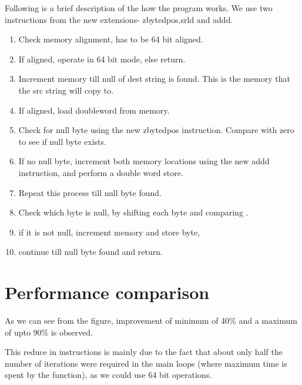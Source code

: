 \documentclass[12pt]{article}
\begin{document}
Following is a brief description of the how the program works. We use two instructions from the new extensions- zbytedpos,srld and addd. 


\begin{enumerate}
    \item Check memory alignment, has to be 64 bit aligned.
    \item If aligned, operate in 64 bit mode, else return.
    \item Increment memory till null of dest string is found. This is the memory that the src string will copy to.
    \item If aligned, load doubleword from memory.
    \item Check for null byte using the new zbytedpos instruction. Compare with zero to see if null byte exists.
    \item If no null byte, increment both memory locations using the new addd instruction, and perform a double word store.
    \item Repeat this process till null byte found.
    \item Check which byte is null, by shifting each byte and comparing .
    \item if it is not null, increment memory and store byte,
    \item continue till null byte found and return.
\end{enumerate}

\section{Performance comparison}
As we can see from the figure, improvement of minimum of 40\% and a maximum of upto 90\% is observed.


This reduce in instructions is mainly due to the fact that about only half the number of iterations were required in the main loops (where maximum time is spent by the function), as we could use 64 bit operations.
\end{document}
